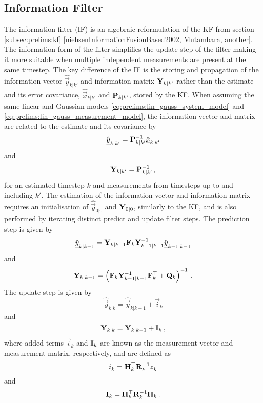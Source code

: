 \subsection{Information Filter}\label{subsec:prelims:if}
The information filter (IF) is an algebraic reformulation of the KF from section \ref{subsec:prelims:kf} [niehsenInformationFusionBased2002, Mutambara, another]. The information form of the filter simplifies the update step of the filter making it more suitable when multiple independent measurements are present at the same timestep. The key difference of the IF is the storing and propagation of the information vector $\hat{\vec{y}}_{k|k'}$ and information matrix ${{\mathbf{Y}}}_{k|k'}$ rather than the estimate and its error covariance, $\hat{\vec{x}}_{k|k'}$ and ${{\mathbf{P}}}_{k|k'}$, stored by the KF. When assuming the same linear and Gaussian models \eqref{eq:prelims:lin_gauss_system_model} and \eqref{eq:prelims:lin_gauss_measurement_model}, the information vector and matrix are related to the estimate and its covariance by
\begin{equation}\label{eq:prelims:info_vec_defn}
    \hat{{\underline{y}}}_{k|k'} = {{\mathbf{P}}}_{k|k'}^{-1}\hat{{\underline{x}}}_{k|k'}
\end{equation}
and
\begin{equation}\label{eq:prelims:info_mat_defn}
    {\ensuremath{{\mathbf{Y}}}}_{k|k'} = {{\mathbf{P}}}_{k|k'}^{-1}\,,
\end{equation}
for an estimated timestep $k$ and measurements from timesteps up to and including $k'$. The estimation of the information vector and information matrix requires an initialisation of $\hat{\vec{y}}_{0|0}$ and ${{\mathbf{Y}}}_{0|0}$, similarly to the KF, and is also performed by iterating distinct predict and update filter steps. The prediction step is given by
\begin{equation}\label{eq:prelims:if_info_vec_predict}
    \hat{{\underline{y}}}_{k|k-1} = {{\mathbf{Y}}}_{k|k-1}{{\mathbf{F}}}_k{{\mathbf{Y}}}_{k-1|k-1}^{-1}\hat{{\underline{y}}}_{k-1|k-1}
\end{equation}
and
\begin{equation}\label{eq:prelims:if_info_mat_predict}
    {\ensuremath{{\mathbf{Y}}}}_{k|k-1} = \left({{\mathbf{F}}}_k{{\mathbf{Y}}}_{k-1|k-1}^{-1}{{\mathbf{F}}}_k^\top + {{\mathbf{Q}}}_k\right)^{-1}\,.
\end{equation}
The update step is given by
\begin{equation}\label{eq:prelims:if_info_vec_update_single}
    \hat{\vec{y}}_{k|k} = \hat{\vec{y}}_{k|k-1} + \vec{i}_k
\end{equation}
and
\begin{equation}\label{eq:prelims:if_info_mat_update_single}
    {\ensuremath{{\mathbf{Y}}}}_{k|k} = {{\mathbf{Y}}}_{k|k-1} + {{\mathbf{I}}}_k\,,
\end{equation}
where added terms $\vec{i}_k$ and ${{\mathbf{I}}}_k$ are known as the measurement vector and measurement matrix, respectively, and are defined as
\begin{equation}
    {\underline{i}}_k = {{\mathbf{H}}}_k^\top{\ensuremath{{\mathbf{R}}}}_k^{-1}{\underline{z}}_k
\end{equation}
and
\begin{equation}
    {\ensuremath{{\mathbf{I}}}}_k = {{\mathbf{H}}}_k^\top{\ensuremath{{\mathbf{R}}}}_k^{-1}{{\mathbf{H}}}_k\,.
\end{equation}

